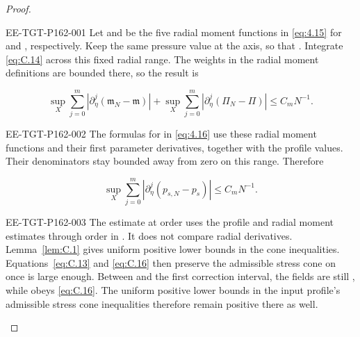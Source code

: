 \begin{proof}
%
\begin{EESegment}{EE-TGT-P162-001}
Let  and  be the five radial moment functions in \eqref{eq:4.15} for
and , respectively. Keep the same pressure value  at the axis, so that
.
Integrate \eqref{eq:C.14} across this fixed radial range. The weights in the radial moment definitions are bounded there, so the result is
\end{EESegment}
\begin{equation}
 \sup_X\sum_{j=0}^m\left|\partial_\eta^j(\mathfrak m_N-\mathfrak m)\right|
 +\sup_X\sum_{j=0}^m\left|\partial_\eta^j(\Pi_N-\Pi)\right|
 \leq C_mN^{-1}.
\tag{C.15}\label{eq:C.15}
\end{equation}
\begin{EESegment}{EE-TGT-P162-002}
The formulas for  in \eqref{eq:4.16} use these radial moment functions and their first
parameter derivatives, together with the profile values. Their denominators stay bounded away
from zero on this range. Therefore
\end{EESegment}
\begin{equation}
 \sup_X\sum_{j=0}^m\left|\partial_\eta^j(p_{s,N}-p_s)\right|
 \leq C_mN^{-1}.
\tag{C.16}\label{eq:C.16}
\end{equation}
\begin{EESegment}{EE-TGT-P162-003}
The estimate at order  uses the profile and radial moment estimates through order
 in .
It does not compare radial derivatives. Lemma~\ref{lem:C.1} gives uniform positive lower bounds in the cone
inequalities. Equations~\eqref{eq:C.13} and \eqref{eq:C.16} then preserve the admissible stress cone on
 once
 is large enough. Between  and the first correction interval, the fields are still
, while  obeys
\eqref{eq:C.16}. The uniform positive lower bounds in the input profile's admissible stress cone
inequalities therefore remain positive there as well.
\end{EESegment}


\end{proof}
